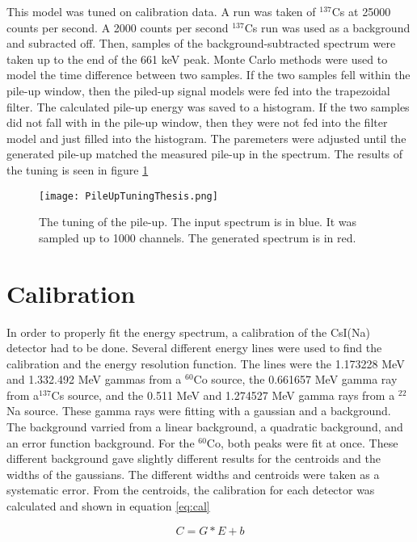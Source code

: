 This model was tuned on calibration data. 
A run was taken of $^{137}$Cs at 25000 counts per second.
A 2000 counts per second $^{137}$Cs run was used as a background and subracted off.
Then, samples of the background-subtracted spectrum were taken up to the end of the 661 keV peak.
Monte Carlo methods were used to model the time difference between two samples.
If the two samples fell within the pile-up window, then the piled-up signal models were fed into the trapezoidal filter.
The calculated pile-up energy was saved to a histogram.
If the two samples did not fall with in the pile-up window, then they were not fed into the filter model and just filled into the histogram.
The paremeters were adjusted until the generated pile-up matched the measured pile-up in the spectrum.
The results of the tuning is seen in figure \ref{fig:pileuptune}

\begin{figure}[!htb]
	\centerline{\texttt{[image: PileUpTuningThesis.png]}}
	\caption{The tuning of the pile-up.
		 The input spectrum is in blue.
		 It was sampled up to 1000 channels.
		 The generated spectrum is in red.}
	\label{fig:pileuptune}
\end{figure}

\section{Calibration}
In order to properly fit the energy spectrum, a calibration of the CsI(Na) detector had to be done.
Several different energy lines were used to find the calibration and the energy resolution function.
The lines were the 1.173228 MeV and 1.332.492 MeV gammas from a $^{60}$Co source, the 0.661657 MeV gamma ray from a$^{137}$Cs source, and the 0.511 MeV and 1.274527 MeV gamma rays from a $^{22}$Na source.
These gamma rays were fitting with a gaussian and a background.
The background varried from a linear background, a quadratic background, and an error function background.
For the $^{60}$Co, both peaks were fit at once.
These different background gave slightly different results for the centroids and the widths of the gaussians.
The different widths and centroids were taken as a systematic error.
From the centroids, the calibration for each detector was calculated and shown in equation \ref{eq:cal}

\begin{equation}
	C = G * E + b
	\label{eq:cal}
\end{equation}

